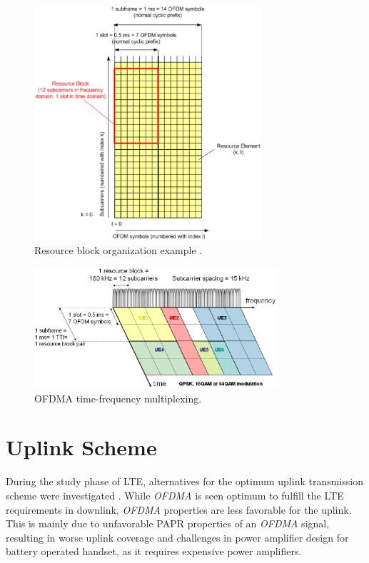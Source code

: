 \begin{figure}[htbp]
    \centering
    \includegraphics[width=0.75\textwidth]{./figures/ofdm_resource_block}
    \caption{ Resource block organization example \cite{umtslte}.
    \label{fig:ofdmresblk}}
\end{figure}

\begin{figure}[htbp]
    \centering
    \includegraphics[width=0.8\textwidth]{./figures/downlink_channels}
    \caption{ OFDMA time-frequency multiplexing.
    \label{fig:dlchann}}
\end{figure}


\section{Uplink Scheme}%

During the study phase of LTE, alternatives for the optimum uplink transmission
scheme were investigated \cite{umtslte}. While \textit{OFDMA} is seen optimum to
fulfill the LTE requirements in downlink, \textit{OFDMA} properties are less
favorable for the uplink. This is mainly due to unfavorable PAPR properties of
an \textit{OFDMA} signal, resulting in worse uplink coverage and challenges in
power amplifier design for battery operated handset, as it requires expensive
power amplifiers.

